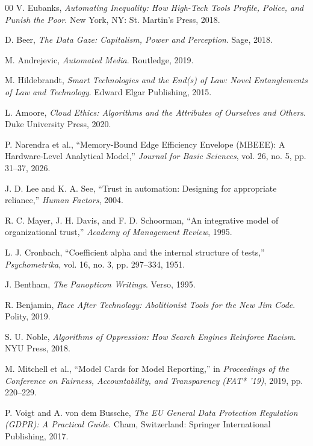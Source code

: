 \documentclass[conference]{IEEEtran}
\begin{document}
\begin{thebibliography}{00}
 V. Eubanks, \textit{Automating Inequality: How High-Tech Tools Profile, Police, and Punish the Poor}. New York, NY: St. Martin's Press, 2018.

 D. Beer, \textit{The Data Gaze: Capitalism, Power and Perception}. Sage, 2018.

 M. Andrejevic, \textit{Automated Media}. Routledge, 2019.

 M. Hildebrandt, \textit{Smart Technologies and the End(s) of Law: Novel Entanglements of Law and Technology}. Edward Elgar Publishing, 2015.

 L. Amoore, \textit{Cloud Ethics: Algorithms and the Attributes of Ourselves and Others}. Duke University Press, 2020.

 P. Narendra et al., ``Memory-Bound Edge Efficiency Envelope (MBEEE): A Hardware-Level Analytical Model,'' \textit{Journal for Basic Sciences}, vol. 26, no. 5, pp. 31--37, 2026.

 J. D. Lee and K. A. See, ``Trust in automation: Designing for appropriate reliance,'' \textit{Human Factors}, 2004.

 R. C. Mayer, J. H. Davis, and F. D. Schoorman, ``An integrative model of organizational trust,'' \textit{Academy of Management Review}, 1995.

 L. J. Cronbach, ``Coefficient alpha and the internal structure of tests,'' \textit{Psychometrika}, vol. 16, no. 3, pp. 297--334, 1951.

 J. Bentham, \textit{The Panopticon Writings}. Verso, 1995.

 R. Benjamin, \textit{Race After Technology: Abolitionist Tools for the New Jim Code}. Polity, 2019.

 S. U. Noble, \textit{Algorithms of Oppression: How Search Engines Reinforce Racism}. NYU Press, 2018.

 M. Mitchell et al., ``Model Cards for Model Reporting,'' in \textit{Proceedings of the Conference on Fairness, Accountability, and Transparency (FAT* '19)}, 2019, pp. 220--229.

 P. Voigt and A. von dem Bussche, \textit{The EU General Data Protection Regulation (GDPR): A Practical Guide}. Cham, Switzerland: Springer International Publishing, 2017.

\end{thebibliography}
\end{document}
